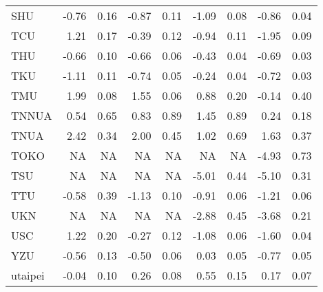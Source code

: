 \begin{longtable}[t]{lrrrrrrrr}
\hspace{1em}SHU & -0.76 & 0.16 & -0.87 & 0.11 & -1.09 & 0.08 & -0.86 & 0.04\\
\hspace{1em}TCU & 1.21 & 0.17 & -0.39 & 0.12 & -0.94 & 0.11 & -1.95 & 0.09\\
\hspace{1em}THU & -0.66 & 0.10 & -0.66 & 0.06 & -0.43 & 0.04 & -0.69 & 0.03\\
\hspace{1em}TKU & -1.11 & 0.11 & -0.74 & 0.05 & -0.24 & 0.04 & -0.72 & 0.03\\
\hspace{1em}TMU & 1.99 & 0.08 & 1.55 & 0.06 & 0.88 & 0.20 & -0.14 & 0.40\\
\hspace{1em}TNNUA & 0.54 & 0.65 & 0.83 & 0.89 & 1.45 & 0.89 & 0.24 & 0.18\\
\hspace{1em}TNUA & 2.42 & 0.34 & 2.00 & 0.45 & 1.02 & 0.69 & 1.63 & 0.37\\
\hspace{1em}TOKO & NA & NA & NA & NA & NA & NA & -4.93 & 0.73\\
\hspace{1em}TSU & NA & NA & NA & NA & -5.01 & 0.44 & -5.10 & 0.31\\
\hspace{1em}TTU & -0.58 & 0.39 & -1.13 & 0.10 & -0.91 & 0.06 & -1.21 & 0.06\\
\hspace{1em}UKN & NA & NA & NA & NA & -2.88 & 0.45 & -3.68 & 0.21\\
\hspace{1em}USC & 1.22 & 0.20 & -0.27 & 0.12 & -1.08 & 0.06 & -1.60 & 0.04\\
\hspace{1em}YZU & -0.56 & 0.13 & -0.50 & 0.06 & 0.03 & 0.05 & -0.77 & 0.05\\
\hspace{1em}utaipei & -0.04 & 0.10 & 0.26 & 0.08 & 0.55 & 0.15 & 0.17 & 0.07\\*
\end{longtable}
